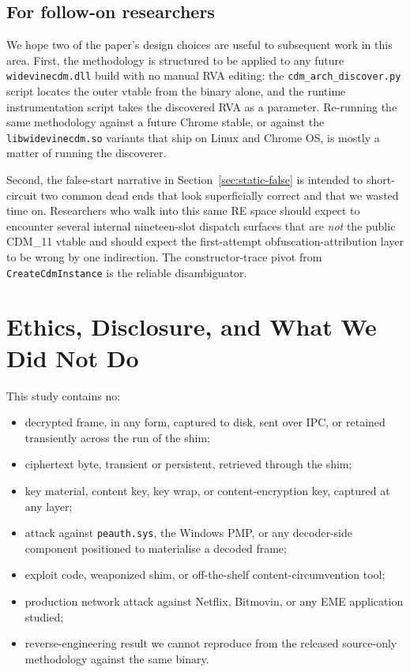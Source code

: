 \documentclass[11pt,letterpaper]{article}
\begin{document}
\subsection{For follow-on researchers}

We hope two of the paper's design choices are useful to subsequent
work in this area. First, the methodology is structured to be
applied to any future \texttt{widevinecdm.dll} build with no manual
RVA editing: the \texttt{cdm\_arch\_discover.py} script locates the
outer vtable from the binary alone, and the runtime instrumentation
script takes the discovered RVA as a parameter. Re-running the same
methodology against a future Chrome stable, or against the
\texttt{libwidevinecdm.so} variants that ship on Linux and Chrome
OS, is mostly a matter of running the discoverer.

Second, the false-start narrative in
Section~\ref{sec:static-false} is intended to short-circuit two
common dead ends that look superficially correct and that we wasted
time on. Researchers who walk into this same RE space should expect
to encounter several internal nineteen-slot dispatch surfaces that
are \emph{not} the public CDM\_11 vtable and should expect the
first-attempt obfuscation-attribution layer to be wrong by one
indirection. The constructor-trace pivot from
\texttt{CreateCdmInstance} is the reliable disambiguator.

\section{Ethics, Disclosure, and What We Did Not Do}
\label{sec:ethics}

This study contains no:
\begin{itemize}[itemsep=1pt,topsep=2pt]
\item decrypted frame, in any form, captured to disk, sent over IPC,
      or retained transiently across the run of the shim;
\item ciphertext byte, transient or persistent, retrieved through
      the shim;
\item key material, content key, key wrap, or content-encryption
      key, captured at any layer;
\item attack against \texttt{peauth.sys}, the Windows PMP, or any
      decoder-side component positioned to materialise a decoded
      frame;
\item exploit code, weaponized shim, or off-the-shelf
      content-circumvention tool;
\item production network attack against Netflix, Bitmovin, or any
      EME application studied;
\item reverse-engineering result we cannot reproduce from the
      released source-only methodology against the same binary.
\end{itemize}
\end{document}

